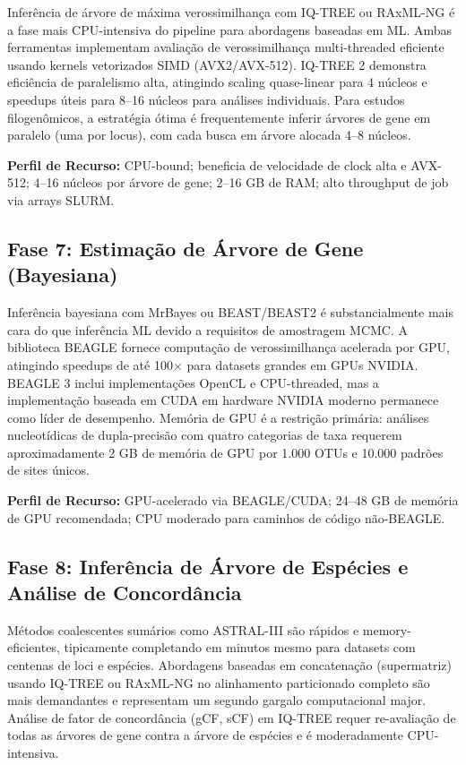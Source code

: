 Inferência de árvore de máxima verossimilhança com IQ-TREE \parencite{minh2020} ou RAxML-NG \parencite{kozlov2019} é a fase mais CPU-intensiva do pipeline para abordagens baseadas em ML. Ambas ferramentas implementam avaliação de verossimilhança multi-threaded eficiente usando kernels vetorizados SIMD (AVX2/AVX-512). IQ-TREE 2 demonstra eficiência de paralelismo alta, atingindo scaling quase-linear para 4 núcleos e speedups úteis para 8--16 núcleos para análises individuais. Para estudos filogenômicos, a estratégia ótima é frequentemente inferir árvores de gene em paralelo (uma por locus), com cada busca em árvore alocada 4--8 núcleos.

\textbf{Perfil de Recurso:} CPU-bound; beneficia de velocidade de clock alta e AVX-512; 4--16 núcleos por árvore de gene; 2--16 GB de RAM; alto throughput de job via arrays SLURM.

\subsection{Fase 7: Estimação de Árvore de Gene (Bayesiana)}

Inferência bayesiana com MrBayes \parencite{ronquist2012} ou BEAST/BEAST2 \parencite{bouckaert2019} é substancialmente mais cara do que inferência ML devido a requisitos de amostragem MCMC. A biblioteca BEAGLE \parencite{ayres2019} fornece computação de verossimilhança acelerada por GPU, atingindo speedups de até 100$\times$ para datasets grandes em GPUs NVIDIA. BEAGLE 3 inclui implementações OpenCL e CPU-threaded, mas a implementação baseada em CUDA em hardware NVIDIA moderno permanece como líder de desempenho. Memória de GPU é a restrição primária: análises nucleotídicas de dupla-precisão com quatro categorias de taxa requerem aproximadamente 2 GB de memória de GPU por 1.000 OTUs e 10.000 padrões de sites únicos.

\textbf{Perfil de Recurso:} GPU-acelerado via BEAGLE/CUDA; 24--48 GB de memória de GPU recomendada; CPU moderado para caminhos de código não-BEAGLE.

\subsection{Fase 8: Inferência de Árvore de Espécies e Análise de Concordância}

Métodos coalescentes sumários como ASTRAL-III \parencite{zhang2018} são rápidos e memory-eficientes, tipicamente completando em minutos mesmo para datasets com centenas de loci e espécies. Abordagens baseadas em concatenação (supermatriz) usando IQ-TREE ou RAxML-NG no alinhamento particionado completo são mais demandantes e representam um segundo gargalo computacional major. Análise de fator de concordância (gCF, sCF) em IQ-TREE requer re-avaliação de todas as árvores de gene contra a árvore de espécies e é moderadamente CPU-intensiva.

